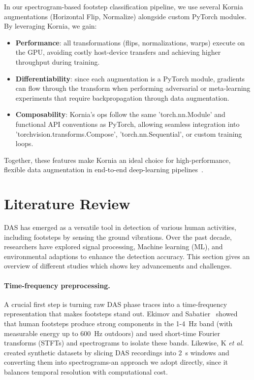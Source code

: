 In our spectrogram-based footstep classification pipeline, we use several Kornia augmentations (Horizontal Flip, Normalize) alongside custom PyTorch modules.  By leveraging Kornia, we gain:

\begin{itemize}
  \item \textbf{Performance}: all transformations (flips, normalizations, warps) execute on the GPU, avoiding costly host-device transfers and achieving higher throughput during training.
  \item \textbf{Differentiability}: since each augmentation is a PyTorch module, gradients can flow through the transform when performing adversarial or meta-learning experiments that require backpropagation through data augmentation.
  \item \textbf{Composability}: Kornia's ops follow the same 'torch.nn.Module' and functional API conventions as PyTorch, allowing seamless integration into 'torchvision.transforms.Compose', 'torch.nn.Sequential', or custom training loops.
\end{itemize}

Together, these features make Kornia an ideal choice for high-performance, flexible data augmentation in end-to-end deep-learning pipelines~\cite{kornia}. 

\section{Literature Review}
DAS has emerged as a versatile tool in detection of various human activities, including footsteps by sensing the ground vibrations. Over the past decade, researchers have explored signal processing, Machine learning (ML), and environmental adaptions to enhance the detection accuracy. This section gives an overview of different studies which shows key advancements and challenges.

\paragraph{Time-frequency preprocessing.}
A crucial first step is turning raw DAS phase traces into a time-frequency representation that makes footsteps stand out. Ekimov and Sabatier~\cite{ekimov2007ultrasonic} showed that human footsteps produce strong components in the 1-4~Hz band (with measurable energy up to 600~Hz outdoors) and used short-time Fourier transforms (STFTs) and spectrograms to isolate these bands. Likewise, K \textit{et al.}~\cite{ks2021acoustic} created synthetic datasets by slicing DAS recordings into 2~s windows and converting them into spectrograms-an approach we adopt directly, since it balances temporal resolution with computational cost.

